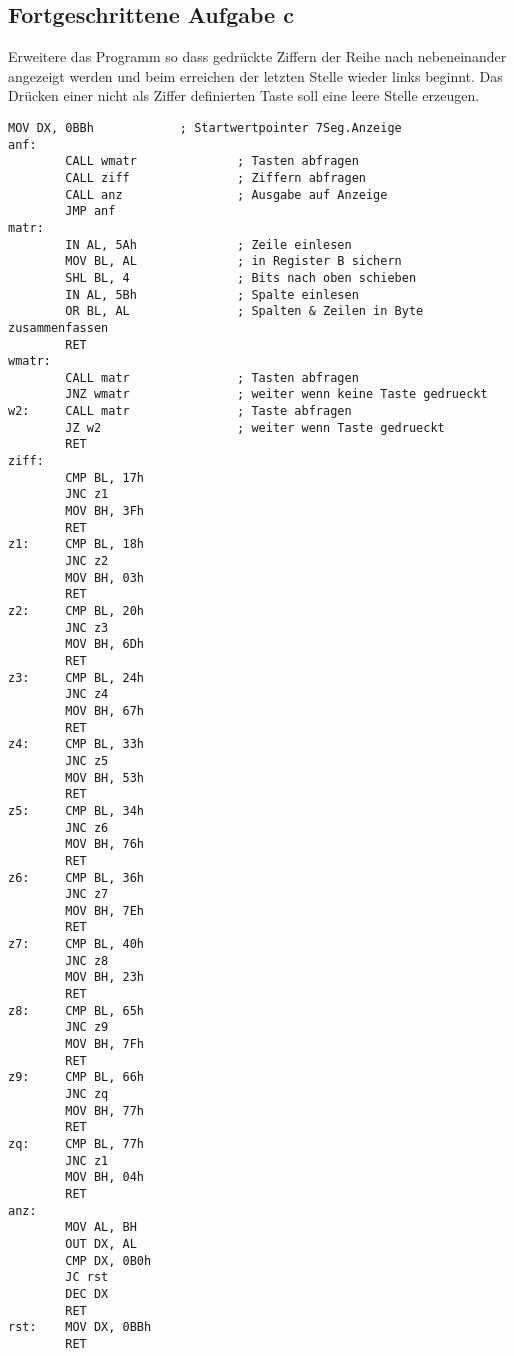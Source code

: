\documentclass[a4paper,10pt,titlepage]{scrartcl}
\begin{document}
\subsection*{Fortgeschrittene Aufgabe c}
Erweitere das Programm so dass gedrückte Ziffern der Reihe nach nebeneinander angezeigt werden und beim erreichen der letzten Stelle wieder links beginnt.
Das Drücken einer nicht als Ziffer definierten Taste soll eine leere Stelle erzeugen.
\begin{lstlisting}[caption= aufgabe 3c]
        MOV DX, 0BBh            ; Startwertpointer 7Seg.Anzeige
anf:
        CALL wmatr              ; Tasten abfragen
        CALL ziff               ; Ziffern abfragen
        CALL anz                ; Ausgabe auf Anzeige
        JMP anf
matr:
        IN AL, 5Ah              ; Zeile einlesen
        MOV BL, AL              ; in Register B sichern
        SHL BL, 4               ; Bits nach oben schieben
        IN AL, 5Bh              ; Spalte einlesen
        OR BL, AL               ; Spalten & Zeilen in Byte zusammenfassen
        RET
wmatr:
        CALL matr               ; Tasten abfragen
        JNZ wmatr               ; weiter wenn keine Taste gedrueckt
w2:     CALL matr               ; Taste abfragen
        JZ w2                   ; weiter wenn Taste gedrueckt
        RET
ziff:
        CMP BL, 17h
        JNC z1
        MOV BH, 3Fh
        RET
z1:     CMP BL, 18h
        JNC z2
        MOV BH, 03h
        RET
z2:     CMP BL, 20h
        JNC z3
        MOV BH, 6Dh
        RET
z3:     CMP BL, 24h
        JNC z4
        MOV BH, 67h
        RET
z4:     CMP BL, 33h
        JNC z5
        MOV BH, 53h
        RET
z5:     CMP BL, 34h
        JNC z6
        MOV BH, 76h
        RET
z6:     CMP BL, 36h
        JNC z7
        MOV BH, 7Eh
        RET
z7:     CMP BL, 40h
        JNC z8
        MOV BH, 23h
        RET
z8:     CMP BL, 65h
        JNC z9
        MOV BH, 7Fh
        RET
z9:     CMP BL, 66h
        JNC zq
        MOV BH, 77h
        RET
zq:     CMP BL, 77h
        JNC z1
        MOV BH, 04h
        RET
anz:
        MOV AL, BH
        OUT DX, AL
        CMP DX, 0B0h
        JC rst
        DEC DX
        RET
rst:    MOV DX, 0BBh
        RET    
\end{lstlisting}
\end{document}
